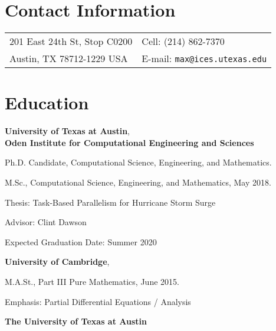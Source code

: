 \documentclass[margin,line]{res}
\newenvironment{list1}{
  \begin{list}{\ding{113}}{%
      \setlength{\itemsep}{0in}
      \setlength{\parsep}{0in} \setlength{\parskip}{0in}
      \setlength{\topsep}{0in} \setlength{\partopsep}{0in}
      \setlength{\leftmargin}{0.17in}}}{\end{list}}
\begin{document}
 

\begin{resume}

\section{\sc Contact Information} 
\begin{tabular}{@{}p{3.25in}p{4in}}
201 East 24th St, Stop C0200 & { Cell:} (214) 862-7370 \\
Austin, TX 78712-1229 USA & {E-mail:} {\tt max@ices.utexas.edu}
\end{tabular} 


\section{\sc Education} 

\textbf{University of Texas at Austin}, \\
\textbf{Oden Institute for Computational Engineering and Sciences} \\ 
\vspace*{-.1in} 

\begin{list1} 
\item[] Ph.D. Candidate, Computational Science, Engineering, and Mathematics.
\item[] M.Sc., Computational Science, Engineering, and Mathematics, May 2018.
\item[] Thesis: Task-Based Parallelism for Hurricane Storm Surge
\item[] Advisor: Clint Dawson
\item[] Expected Graduation Date: Summer 2020
\end{list1}

\textbf{University of Cambridge}, \\
\vspace*{-.1in}

\begin{list1}
\item[] M.A.St., Part III Pure Mathematics, June 2015.
\item[] Emphasis: Partial Differential Equations / Analysis
\end{list1}

\textbf{The University of Texas at Austin} \\


\end{resume}
\end{document}
